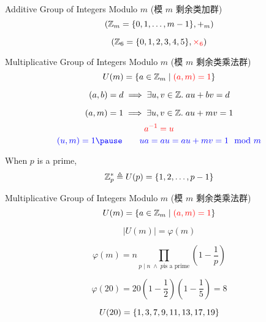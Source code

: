 \begin{frame}
  \begin{exampleblock}{Additive Group of Integers Modulo $m$ (模 $m$ 剩余类加群)}
    \[
      (\mathbb{Z}_{m} = \{0, 1, \dots, m-1\}, +_{m})
    \]
  \end{exampleblock}

  \pause
  \vspace{0.30cm}
  \[
    (\mathbb{Z}_{6} = \{0, 1, 2, 3, 4, 5\}, \textcolor{red}{\times_{6}})
  \]
\end{frame}

\begin{frame}
  \begin{exampleblock}{Multiplicative Group of Integers Modulo $m$ (模 $m$ 剩余类乘法群)}
    \[
      U(m) = \{a \in \mathbb{Z}_{m} \mid \textcolor{red}{(a, m) = 1}\}
    \]
  \end{exampleblock}

  \pause
  \vspace{0.60cm}
  \begin{theorem}
    \[
      (a, b) = d \implies \exists u, v \in \mathbb{Z}.\; au + bv = d
    \]
  \end{theorem}

  \pause
  \[
    (a, m) = 1 \implies \exists u, v \in \mathbb{Z}.\; au + mv = 1
  \]
  \pause
  \[
    \textcolor{red}{a^{-1} = u}
  \]
  \pause
  \[
    \blue{(u, m) = 1 \pause\qquad ua = au = au + mv = 1\mod{m}}
  \]
\end{frame}

\begin{frame}{}
  \begin{center}
    When $p$ is a prime,
    \[
      \mathbb{Z}^{\ast}_{p} \triangleq U(p) = \{1, 2, \dots, p-1\}
    \]
  \end{center}
\end{frame}

\begin{frame}
  \begin{exampleblock}{Multiplicative Group of Integers Modulo $m$ (模 $m$ 剩余类乘法群)}
    \[
      U(m) = \{a \in \mathbb{Z}_{m} \mid \textcolor{red}{(a, m) = 1}\}
    \]
  \end{exampleblock}

  \pause
  \[
    \big\lvert U(m) \big\rvert = \varphi(m)
  \]

  \pause
  \vspace{0.50cm}
  \begin{definition}
    \[
      \varphi(m) = n \prod_{p \mid n \;\land\; p \text{is a prime}}
        \left(1 - \frac{1}{p} \right)
    \]
  \end{definition}

  \pause
  \[
    \varphi(20) = 20 (1 - \frac{1}{2}) (1 - \frac{1}{5}) = 8
  \]

  \pause
  \[
    U(20) = \{1, 3, 7, 9, 11, 13, 17, 19\}
  \]
\end{frame}

